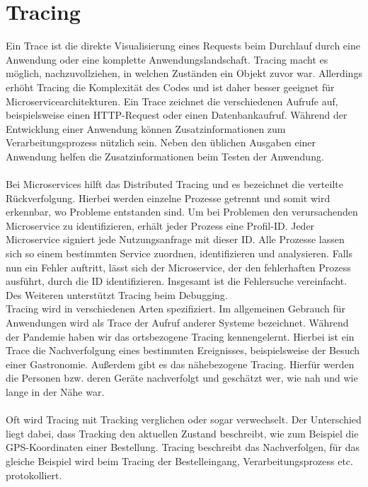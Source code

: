 \section{Tracing}\label{sec:tracing}
Ein Trace ist die direkte Visualisierung eines Requests beim Durchlauf durch eine Anwendung oder eine komplette Anwendungslandschaft.
Tracing macht es möglich, nachzuvollziehen, in welchen Zuständen ein Objekt zuvor war.
Allerdings erhöht Tracing die Komplexität des Codes und ist daher besser geeignet für Microservicearchitekturen.
Ein Trace zeichnet die verschiedenen Aufrufe auf, beispielsweise einen HTTP-Request oder einen Datenbankaufruf.
Während der Entwicklung einer Anwendung können Zusatzinformationen zum Verarbeitungsprozess nützlich sein.
Neben den üblichen Ausgaben einer Anwendung helfen die Zusatzinformationen beim Testen der Anwendung.
\\
\\
Bei Microservices hilft das Distributed Tracing und es bezeichnet die verteilte Rückverfolgung.
Hierbei werden einzelne Prozesse getrennt und somit wird erkennbar, wo Probleme entstanden sind.
Um bei Problemen den verursachenden Microservice zu identifizieren, erhält jeder Prozess eine Profil-ID.
Jeder Microservice signiert jede Nutzungsanfrage mit dieser ID.
Alle Prozesse lassen sich so einem bestimmten Service zuordnen, identifizieren und analysieren.
Falls nun ein Fehler auftritt, lässt sich der Microservice, der den fehlerhaften Prozess ausführt, durch die ID identifizieren.
Insgesamt ist die Fehlersuche vereinfacht.
Des Weiteren unterstützt Tracing beim Debugging.
\\
Tracing wird in verschiedenen Arten spezifiziert.
Im allgemeinen Gebrauch für Anwendungen wird als Trace der Aufruf anderer Systeme bezeichnet.
Während der Pandemie haben wir das ortsbezogene Tracing kennengelernt.
Hierbei ist ein Trace die Nachverfolgung eines bestimmten Ereignisses, beispielsweise der Besuch einer Gastronomie.
Außerdem gibt es das nähebezogene Tracing.
Hierfür werden die Personen bzw. deren Geräte nachverfolgt und geschätzt wer, wie nah und wie lange in der Nähe war.
\\
\\
Oft wird Tracing mit Tracking verglichen oder sogar verwechselt.
Der Unterschied liegt dabei, dass Tracking den aktuellen Zustand beschreibt, wie zum Beispiel die GPS-Koordinaten einer Bestellung.
Tracing beschreibt das Nachverfolgen, für das gleiche Beispiel wird beim Tracing der Bestelleingang, Verarbeitungsprozess etc. protokolliert.\autocite{adesso, monstarlab, dev-insider}


